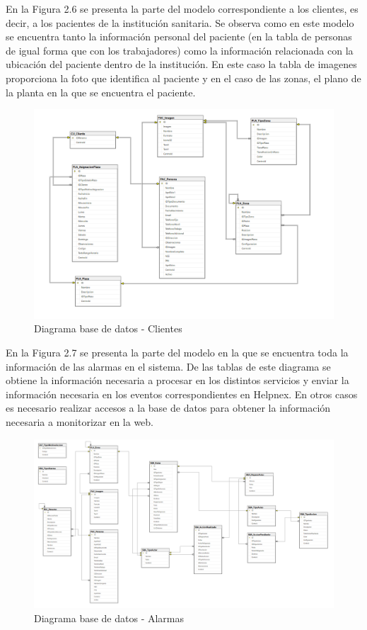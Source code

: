 \newpage
En la Figura 2.6 se presenta la parte del modelo correspondiente a los clientes, es decir, a los pacientes de la institución sanitaria. Se observa como en este modelo se encuentra tanto la información personal del paciente (en la tabla de personas de igual forma que con los trabajadores) como la información relacionada con la ubicación del paciente dentro de la institución. En este caso la tabla de imagenes proporciona la foto que identifica al paciente y en el caso de las zonas, el plano de la planta en la que se encuentra el paciente.

\begin{figure}[H]
    \centering
    \includegraphics[width=16cm]{Imagenes/Diagrama-BD-Clientes}
    \caption{Diagrama base de datos - Clientes}
    \label{fig:Diagrama-BD-Clientes}
\end{figure}

\newpage
En la Figura 2.7 se presenta la parte del modelo en la que se encuentra toda la información de las alarmas en el sistema. De las tablas de este diagrama se obtiene la información necesaria a procesar en los distintos servicios y enviar la información necesaria en los eventos correspondientes en Helpnex. En otros casos es necesario realizar accesos a la base de datos para obtener la información necesaria a monitorizar en la web.

\begin{figure}[H]
    \centering
    \includegraphics[width=16cm]{Imagenes/Diagrama-BD-Alertas}
    \caption{Diagrama base de datos - Alarmas}
    \label{fig:Diagrama-BD-}
\end{figure}

